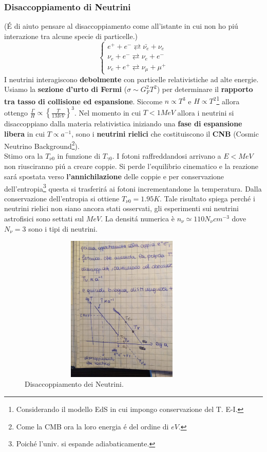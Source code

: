 \documentclass[12pt, a4paper]{article}
\begin{document}
\subsubsection{Disaccoppiamento di Neutrini}
(\'{E} di aiuto pensare al disaccoppiamento come all'istante in cui non ho pi\'{u} interazione tra alcune specie di particelle.)\\
\begin{equation}
    \begin{cases}
    e^{+} + e^{-}  \rightleftarrows \bar{\nu_e} + \nu_e 
    \\
    \nu_{e} + e^- \rightleftarrows \nu_{e} + e^-
    \\
    \nu_{e} + e^+ \rightleftarrows \nu_{\mu} + \mu^+
    \end{cases}
\end{equation}
I neutrini interagiscono \textbf{debolmente} con particelle relativistiche ad alte energie. Usiamo la \textbf{sezione d'urto di Fermi} ($\sigma \sim G_F^2T^2$) per determinare il \textbf{rapporto tra tasso di collisione ed espansione}. Siccome $n\propto T^3$ e $H \propto T^2 $\footnote{Considerando il modello EdS in cui impongo conservazione del T. E-I.} allora ottengo $\frac{\Gamma}{H}\propto \left\{\frac{T}{1 MeV}\right\}^3$. Nel momento in cui $T<1MeV$ allora i neutrini si disaccoppiano dalla materia relativistica iniziando una \textbf{fase di espansione libera} in cui $T\propto a^{-1}$, sono i \textbf{neutrini rielici} che costituiscono il \textbf{CNB} (Cosmic Neutrino Background\footnote{Come la CMB ora la loro energia \'{e} del ordine di $eV$.}).\\
Stimo ora la $T_{\nu 0}$ in funzione di $T_{\gamma 0}$. I fotoni raffreddandosi arrivano a $E<MeV$ non riusciranno pi\'{u} a creare coppie. Si perde l'equilibrio cinematico e la reazione sar\'{a} spostata verso \textbf{l'annichilazione} delle coppie e per conservazione dell'entropia\footnote{Poich\'{e} l'univ. si espande adiabaticamente.} questa si trasferir\'{a} ai fotoni incrementandone la temperatura. Dalla conservazione dell'entropia si ottiene $T_{\nu 0}=1.95K$. Tale risultato spiega perch\'{e} i neutrini rielici non siano ancora stati osservati, gli esperimenti sui neutrini astrofisici sono settati sul $MeV$. La densit\'{a} numerica è $n_{\nu}\simeq 110 N_{\nu} cm^{-3}$ dove $N_{\nu}=3$ sono i tipi di neutrini.
\begin{figure}[htp]
    \centering
    \includegraphics[width=10cm, height=7cm]{images/disaccoppiamento.jpg}
    \caption{Disaccoppiamento dei Neutrini.}
    \label{fig:neutrini}
\end{figure}
\end{document}
